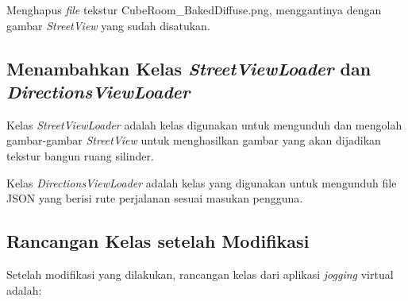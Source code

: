 Menghapus \textit{file} tekstur {CubeRoom\_BakedDiffuse.png}, menggantinya dengan gambar \textit{StreetView} yang sudah disatukan.

\subsection{Menambahkan Kelas \textit{StreetViewLoader} dan \textit{DirectionsViewLoader}}
Kelas \textit{StreetViewLoader} adalah kelas digunakan untuk mengunduh dan mengolah gambar-gambar \textit{StreetView} untuk menghasilkan gambar yang akan dijadikan tekstur bangun ruang silinder. 

Kelas \textit{DirectionsViewLoader} adalah kelas yang digunakan untuk mengunduh file JSON yang berisi rute perjalanan sesuai masukan pengguna. 

\subsection{Rancangan Kelas setelah Modifikasi}

Setelah modifikasi yang dilakukan, rancangan kelas dari aplikasi \textit{jogging} virtual adalah:

